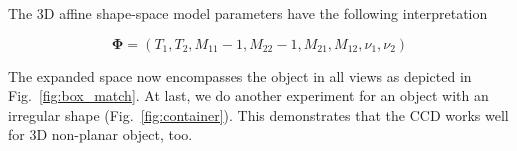 The 3D affine shape-space model parameters have
the following interpretation

\begin{equation}
  \label{eq:4.19}
  \mathbf{\Phi} =  (T_1, T_2, M_{11} - 1, M_{22} - 1, M_{21}, M_{12}, \nu_1, \nu_2)
\end{equation}

The expanded space now encompasses the object in all views as depicted
in Fig.~\ref{fig:box_match}. At last, we do
another experiment for an object with an irregular shape (Fig.~\ref{fig:container}). This
demonstrates that the CCD works well for 3D non-planar object, too.

\begin{figure}[htbp] 
  \begin{minipage}[t]{0.5\linewidth} 
    \centering 
  \end{minipage}%
  \begin{minipage}[t]{0.5\linewidth} 
    \centering 
  \end{minipage} 
  \begin{minipage}[t]{0.5\linewidth} 
    \centering 

\end{minipage}
\end{figure}
